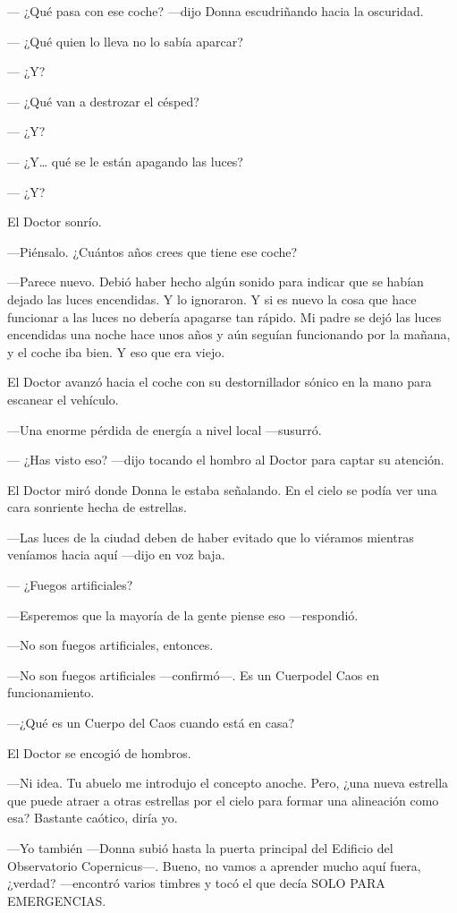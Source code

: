 --- ¿Qué pasa con ese coche? ---dijo Donna escudriñando hacia la
oscuridad.

---  ¿Qué quien lo lleva no lo sabía aparcar?

--- ¿Y?

--- ¿Qué van a destrozar el césped?

--- ¿Y?

--- ¿Y\ldots{} qué se le están apagando las luces?

--- ¿Y?

El Doctor sonrío.

---Piénsalo. ¿Cuántos años crees que tiene ese coche?

---Parece nuevo. Debió haber hecho algún sonido para indicar que se
habían dejado las luces encendidas. Y lo ignoraron. Y si es nuevo la
cosa que hace funcionar a las luces no debería apagarse tan rápido. Mi
padre se dejó las luces encendidas una noche hace unos años y aún
seguían funcionando por la mañana, y el coche iba bien. Y eso que era
viejo.

El Doctor avanzó hacia el coche con su destornillador sónico en la mano
para escanear el vehículo.

---Una enorme pérdida de energía a nivel local ---susurró.

--- ¿Has visto eso?  ---dijo tocando el hombro al Doctor para captar su
atención.

El Doctor miró donde Donna le estaba señalando. En el cielo se podía ver
una cara sonriente hecha de estrellas.

---Las luces de la ciudad deben de haber evitado que lo viéramos
mientras veníamos hacia aquí ---dijo en voz baja.

--- ¿Fuegos artificiales?

---Esperemos que la mayoría de la gente piense eso ---respondió.

---No son fuegos artificiales, entonces.

---No son fuegos artificiales ---confirmó---. Es un Cuerpodel
Caos en funcionamiento.

---¿Qué es un Cuerpo del Caos cuando está en casa?

El Doctor se encogió de hombros.

---Ni idea. Tu abuelo me introdujo el concepto anoche. Pero, ¿una nueva
estrella que puede atraer a otras estrellas por el cielo para formar una
alineación como esa? Bastante caótico, diría yo.

---Yo también ---Donna subió hasta la puerta principal del
Edificio del Observatorio Copernicus---. Bueno, no vamos a aprender
mucho aquí fuera, ¿verdad? ---encontró varios timbres y tocó el que
decía SOLO PARA EMERGENCIAS.

